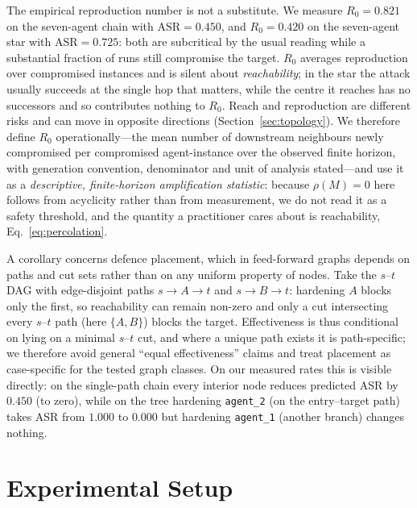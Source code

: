 \documentclass[sigconf,anonymous]{aamas}
\begin{document}
The empirical reproduction number is not a substitute. We measure $R_0 = 0.821$
on the seven-agent chain with $\mathrm{ASR} = 0.450$, and $R_0 = 0.420$ on the
seven-agent star with $\mathrm{ASR} = 0.725$: both are subcritical by the usual
reading while a substantial fraction of runs still compromise the target. $R_0$
averages reproduction over compromised instances and is silent about
\emph{reachability}; in the star the attack usually succeeds at the single hop
that matters, while the centre it reaches has no successors and so contributes
nothing to $R_0$. Reach and reproduction are different risks and can move in
opposite directions (Section~\ref{sec:topology}). We therefore define $R_0$
operationally---the mean number of downstream neighbours newly compromised per
compromised agent-instance over the observed finite horizon, with generation
convention, denominator and unit of analysis stated---and use it as a
\emph{descriptive, finite-horizon amplification statistic}: because $\rho(M)=0$ here
follows from acyclicity rather than from measurement, we do not read it as a safety
threshold, and the quantity a practitioner cares about is reachability,
Eq.~\eqref{eq:percolation}.

A corollary concerns defence placement, which in feed-forward graphs depends on
paths and cut sets rather than on any uniform property of nodes. Take the $s$--$t$
DAG with edge-disjoint paths $s \to A \to t$ and $s \to B \to t$: hardening $A$
blocks only the first, so reachability can remain non-zero and only a cut
intersecting every $s$--$t$ path (here $\{A,B\}$) blocks the target. Effectiveness
is thus conditional on lying on a minimal $s$--$t$ cut, and where a unique path
exists it is path-specific; we therefore avoid general ``equal effectiveness''
claims and treat placement as case-specific for the tested graph classes. On our
measured rates this is visible directly: on the single-path chain every interior
node reduces predicted ASR by $0.450$ (to zero), while on the tree hardening
\texttt{agent\_2} (on the entry--target path) takes ASR from $1.000$ to $0.000$ but
hardening \texttt{agent\_1} (another branch) changes nothing.


\section{Experimental Setup}
\label{sec:setup}
\end{document}
